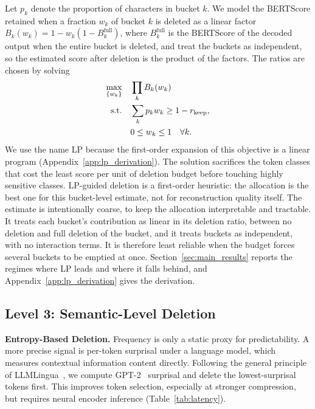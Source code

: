 \documentclass[11pt]{article}
\newcommand{\rkeep}{r_{\mathrm{keep}}}
\begin{document}
Let $p_k$ denote the proportion of characters in bucket $k$. We model the BERTScore retained when a fraction $w_k$ of bucket $k$ is deleted as a linear factor
$
B_k(w_k) = 1 - w_k(1 - B_k^{\mathrm{full}})
$,
where $B_k^{\mathrm{full}}$ is the BERTScore of the decoded output when the entire bucket is deleted, and treat the buckets as independent, so the estimated score after deletion is the product of the factors. The ratios are chosen by solving
\begin{align*}
  \max_{\{w_k\}} \quad & \prod_k B_k(w_k) \\
  \text{s.t.} \quad & \sum_k p_k w_k \ge 1 - \rkeep, \notag \\
                    & 0 \le w_k \le 1 \quad \forall k. \notag
\end{align*}
We use the name LP because the first-order expansion of this objective is a linear program (Appendix~\ref{app:lp_derivation}). The solution sacrifices the token classes that cost the least score per unit of deletion budget before touching highly sensitive classes. LP-guided deletion is a first-order heuristic: the allocation is the best one for this bucket-level estimate, not for reconstruction quality itself. The estimate is intentionally coarse, to keep the allocation interpretable and tractable. It treats each bucket's contribution as linear in its deletion ratio, between no deletion and full deletion of the bucket, and it treats buckets as independent, with no interaction terms. It is therefore least reliable when the budget forces several buckets to be emptied at once. Section~\ref{sec:main_results} reports the regimes where LP leads and where it falls behind, and Appendix~\ref{app:lp_derivation} gives the derivation.

\subsection*{Level 3: Semantic-Level Deletion}

\textbf{Entropy-Based Deletion.}
\label{sec:entropy}
Frequency is only a static proxy for predictability. A more precise signal is per-token surprisal under a language model, which measures contextual information content directly. Following the general principle of LLMLingua~\citep{jiang2023llmlingua}, we compute GPT-2~\citep{radford2019language} surprisal and delete the lowest-surprisal tokens first. This improves token selection, especially at stronger compression, but requires neural encoder inference (Table~\ref{tab:latency}).
\end{document}

